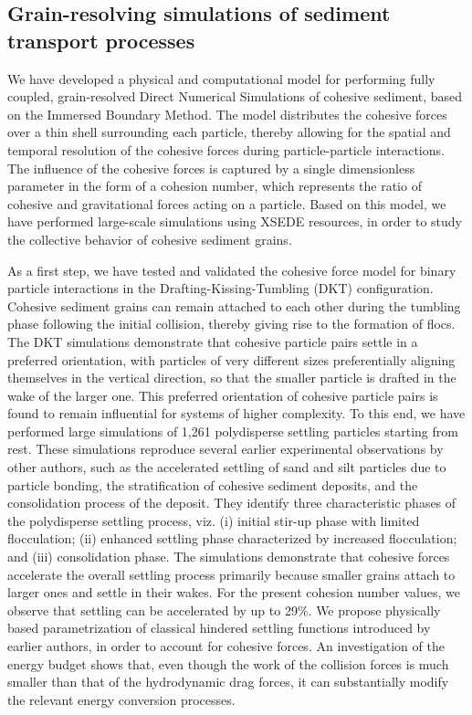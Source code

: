 \documentclass[11pt]{article}
\begin{document}
\subsection*{Grain-resolving simulations of sediment transport processes}

We have developed a physical and computational model for performing fully coupled, grain-resolved Direct Numerical Simulations of cohesive sediment, based on the Immersed Boundary Method. The model distributes the cohesive forces over a thin shell surrounding each particle, thereby allowing for the spatial and temporal resolution of the cohesive forces during particle-particle interactions. The influence of the cohesive forces is captured by a single dimensionless parameter in the form of a cohesion number, which represents the ratio of cohesive and gravitational forces acting on a particle. Based on this model, we have performed large-scale simulations using XSEDE resources, in order to study the collective behavior of cohesive sediment grains.

As a first step, we have tested and validated the cohesive force model for binary particle interactions in the Drafting-Kissing-Tumbling (DKT) configuration. Cohesive sediment grains can remain attached to each other during the tumbling phase following the initial collision, thereby giving rise to the formation of flocs. The DKT simulations demonstrate that cohesive particle pairs settle in a preferred orientation, with particles of very different sizes preferentially aligning themselves in the vertical direction, so that the smaller particle is drafted in the wake of the larger one. This preferred orientation of cohesive particle pairs is found to remain influential for systems of higher complexity. To this end, we have performed large simulations of 1,261 polydisperse settling particles starting from rest. These simulations reproduce several earlier experimental observations by other authors, such as the accelerated settling of sand and silt particles due to particle bonding, the stratification of cohesive sediment deposits, and the consolidation process of the deposit. They identify three characteristic phases of the polydisperse settling process, viz. (i) initial stir-up phase with limited flocculation; (ii) enhanced settling phase characterized by increased flocculation; and (iii) consolidation phase. The simulations demonstrate that cohesive forces accelerate the overall settling process primarily because smaller grains attach to larger ones and settle in their wakes. For the present cohesion number values, we observe that settling can be accelerated by up to 29\%. We propose physically based parametrization of classical hindered settling functions introduced by earlier authors, in order to account for cohesive forces. An investigation of the energy budget shows that, even though the work of the collision forces is much smaller than that of the hydrodynamic drag forces, it can substantially modify the relevant energy conversion processes.
\end{document}
